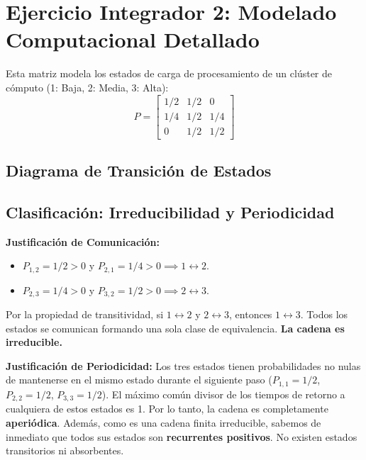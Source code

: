 \documentclass[12pt, a4paper]{article}
\begin{document}
\section{Ejercicio Integrador 2: Modelado Computacional Detallado}
Esta matriz modela los estados de carga de procesamiento de un clúster de cómputo (1: Baja, 2: Media, 3: Alta):
$$ P = \begin{bmatrix} 1/2 & 1/2 & 0 \\ 1/4 & 1/2 & 1/4 \\ 0 & 1/2 & 1/2 \end{bmatrix} $$

\subsection{Diagrama de Transición de Estados}
\begin{center}
\end{center}

\subsection{Clasificación: Irreducibilidad y Periodicidad}
\textbf{Justificación de Comunicación:}
\begin{itemize}
    \item $P_{1,2} = 1/2 > 0$ y $P_{2,1} = 1/4 > 0 \implies 1 \leftrightarrow 2$.
    \item $P_{2,3} = 1/4 > 0$ y $P_{3,2} = 1/2 > 0 \implies 2 \leftrightarrow 3$.
\end{itemize}
Por la propiedad de transitividad, si $1 \leftrightarrow 2$ y $2 \leftrightarrow 3$, entonces $1 \leftrightarrow 3$. Todos los estados se comunican formando una sola clase de equivalencia. \textbf{La cadena es irreducible.}

\textbf{Justificación de Periodicidad:}
Los tres estados tienen probabilidades no nulas de mantenerse en el mismo estado durante el siguiente paso ($P_{1,1}=1/2$, $P_{2,2}=1/2$, $P_{3,3}=1/2$). El máximo común divisor de los tiempos de retorno a cualquiera de estos estados es 1. Por lo tanto, la cadena es completamente \textbf{aperiódica}. Además, como es una cadena finita irreducible, sabemos de inmediato que todos sus estados son \textbf{recurrentes positivos}. No existen estados transitorios ni absorbentes.
\end{document}
